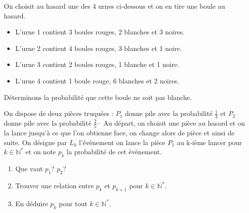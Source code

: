 \documentclass[a4paper,10pt]{report}
\begin{document}
\begin{enumerate}
\begin{Exemple} 
On choisit au hasard une des 4 urnes ci-dessous et on en tire une boule au hasard.
\begin{itemize}
 \item L'urne 1 contient 3 boules rouges, 2 blanches et 3 noires.
 \item L'urne 2 contient 4 boules rouges, 3 blanches et 1 noire.
 \item L'urne 3 contient 2 boules rouges, 1 blanche et 1 noire.
 \item L'urne 4 contient 1 boule rouge, 6 blanches et 2 noires.
\end{itemize}
Déterminons la probabilité que cette boule ne soit pas blanche.

\vspace{7cm}
\end{Exemple}

\begin{ApplicationDirecte} On dispose de deux pièces truquées : $P_1$ donne pile avec la probabilité $\frac{1}{3}$ et $P_2$ donne pile avec la probabilité $\frac{2}{5} \cdot$ Au départ, on choisit une pièce au hasard et on la lance jusqu'à ce que l'on obtienne face, on change alors de pièce et ainsi de suite. On désigne par $L_k$ l'évènement \og on lance la pièce $P_1$ au k-ième lancer \fg pour $k \in \mathbb{N}^*$ et on note $p_k$ la probabilité de cet évènement.
\begin{enumerate}
\item Que vaut $p_1$? $p_2$?
\item Trouver une relation entre $p_k$ et $p_{k+1}$ pour $k \in \mathbb{N}^*$.
\item En déduire $p_k$ pour tout $k \in \mathbb{N}^*$.
\end{enumerate}
\end{ApplicationDirecte}


\end{enumerate}
\end{document}
